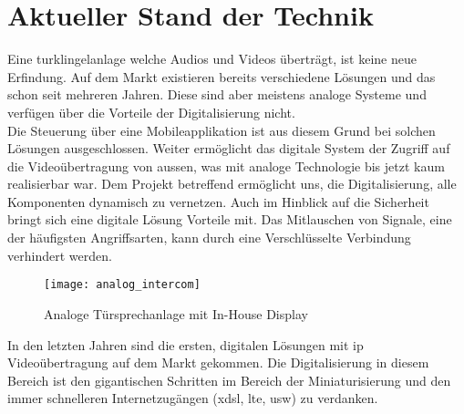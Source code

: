 \section{Aktueller Stand der Technik}
\label{sec:chapterexample}
Eine \gls{turklingelanlage} welche Audios und Videos überträgt, ist keine neue Erfindung. Auf dem Markt existieren bereits verschiedene Lösungen und das schon seit mehreren Jahren. Diese sind aber meistens analoge Systeme und verfügen über die Vorteile der Digitalisierung nicht. 
\\
Die Steuerung über eine Mobileapplikation ist aus diesem Grund bei solchen Lösungen ausgeschlossen.
Weiter ermöglicht das digitale System der Zugriff auf die Videoübertragung von aussen, was mit analoge Technologie bis jetzt kaum realisierbar war.
Dem Projekt betreffend ermöglicht uns, die Digitalisierung, alle Komponenten dynamisch zu vernetzen. Auch im Hinblick auf die Sicherheit bringt sich eine digitale Lösung Vorteile mit. Das Mitlauschen von Signale, eine der häufigsten Angriffsarten, kann durch eine Verschlüsselte Verbindung verhindert werden.  

\begin{figure}[htb!]
	\begin{center}
		\texttt{[image: analog\_intercom]}
		\caption[Analoge Türsprechanlage mit In-House Display]{Analoge Türsprechanlage mit In-House Display}
		\label{fig:analoge_intercom}
	\end{center}
\end{figure}
In den letzten Jahren sind die ersten, digitalen Lösungen mit \gls{ip} Videoübertragung auf dem Markt gekommen. Die Digitalisierung in diesem Bereich ist den gigantischen Schritten im Bereich der Miniaturisierung und den immer schnelleren Internetzugängen (x\gls{dsl}, \gls{lte}, usw) zu verdanken.
\\


